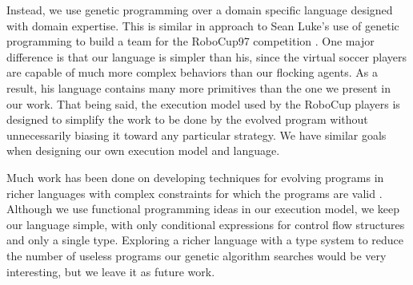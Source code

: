 Instead, we use genetic programming over a domain specific language designed
with domain expertise.
This is similar in approach to Sean Luke's use of genetic programming to build
a team for the RoboCup97 competition \cite{lukeRoboCup97}.
One major difference is that our language is simpler than his, since the
virtual soccer players are capable of much more complex behaviors than our
flocking agents.
As a result, his language contains many more primitives than the one we
present in our work.
That being said, the execution model used by the RoboCup players is designed to
simplify the work to be done by the evolved program without unnecessarily
biasing it toward any particular strategy.
We have similar goals when designing our own execution model and language.

Much work has been done on developing techniques for evolving programs in
richer languages with complex constraints for which the programs are valid
\cite{BriggsGP}.
Although we use functional programming ideas in our execution model, we keep
our language simple, with only conditional expressions for control flow
structures and only a single type.
Exploring a richer language with a type system to reduce the number of useless
programs our genetic algorithm searches would be very interesting, but we leave
it as future work.

